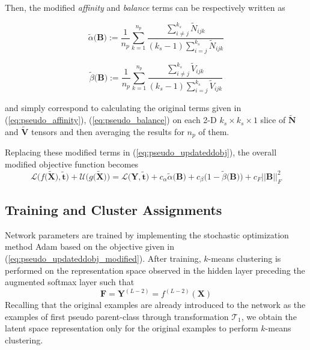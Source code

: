 \documentclass{article} \usepackage{iclr2018_conference,times}
\begin{document}
Then, the modified \textit{affinity} and \textit{balance }terms can be respectively written as 

\begin{minipage}{0.5\linewidth}
	\begin{equation}
	\label{eq:pseudo_modified_affinity}
	\tilde\alpha\big(\boldsymbol{B}\big) := \frac{1}{n_p}\sum\limits_{k=1}^{n_p}\frac{\sum\limits_{i \ne j}^{k_s}{\tilde N_{ijk}}}{(k_s-1)\sum\limits_{i = j}^{k_s}{\tilde N_{ijk}}}
	\end{equation}
\end{minipage}\begin{minipage}{0.5\linewidth}
	\begin{equation}
	\label{eq:pseudo_modified_balance}
	\tilde\beta\big(\boldsymbol{B}\big) := \frac{1}{n_p}\sum\limits_{k=1}^{n_p}\frac{\sum\limits_{i \ne j}^{k_s}{\tilde V_{ijk}}}{(k_s-1)\sum\limits_{i = j}^{k_s}{\tilde V_{ijk}}}
	\end{equation}
\end{minipage}

and simply correspond to calculating the original terms given in (\ref{eq:pseudo_affinity}), (\ref{eq:pseudo_balance}) on each 2-D $k_s \times k_s \times 1$ slice of $\boldsymbol{\tilde N}$ and $\boldsymbol{\tilde V}$ tensors and then averaging the results for $n_p$ of them.

Replacing these modified terms in (\ref{eq:pseudo_updateddobj}), the overall modified objective function becomes 
\begin{equation}
\label{eq:pseudo_updateddobj_modified}
\mathcal{L}\big(f\big(\boldsymbol{\tilde{X}}), \boldsymbol{\tilde{t}}\big) +
\mathcal{U}\big(g\big(\boldsymbol{\tilde{X}}\big)\big) =
\mathcal{L}\big(\boldsymbol{Y}, \boldsymbol{\tilde{t}}\big) + c_{\alpha}\tilde \alpha\big(\boldsymbol{B}\big) + c_{\beta}\big(1-\tilde \beta\big(\boldsymbol{B}\big)\big) + c_F||\boldsymbol{B}||^2_F
\end{equation}

\subsection{Training and Cluster Assignments}
Network parameters are trained by implementing the stochastic optimization method Adam \citep{KingmaB14} based on the objective given in (\ref{eq:pseudo_updateddobj_modified}). After training, $k$-means clustering is performed on the representation space observed in the hidden layer preceding the augmented softmax layer such that
\begin{equation}
\boldsymbol{F} = \boldsymbol{Y}^{(L-2)} = f^{(L-2)}(\boldsymbol{X})
\end{equation}
Recalling that the original examples are already introduced to the network as the examples of first pseudo parent-class through transformation $\mathcal{T}_1$, we obtain the latent space representation only for the original examples to perform $k$-means clustering. 
\end{document}
